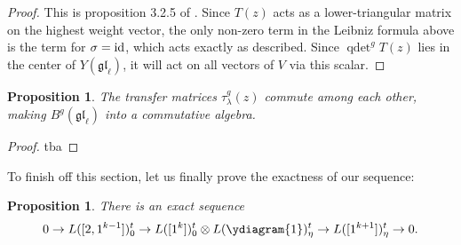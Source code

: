 \documentclass[11pt]{report}
\newtheorem{prop}[theorem]{Proposition}
\theoremstyle{definition}
\theoremstyle{remark}
\theoremstyle{remark}
\newcommand{\id}{\textnormal{id}}
\begin{document}
\begin{proof}
This is proposition 3.2.5 of \cite{book:molev}. Since $T(z)$ acts as a lower-triangular matrix on the highest weight vector, the only non-zero term in the Leibniz formula above is the term for $\sigma = \id$, which acts exactly as described. Since $\operatorname{qdet}^g T(z)$ lies in the center of $Y(\mathfrak{gl}_\ell)$, it will act on all vectors of $V$ via this scalar.
\end{proof}

\begin{prop}
The transfer matrices $\tau_\lambda^g(z)$ commute among each other, making $B^g(\mathfrak{gl}_\ell)$ into a commutative algebra.
\end{prop}

\begin{proof}
tba
\end{proof}

To finish off this section, let us finally prove the exactness of our sequence:

\begin{prop}
There is an exact sequence
\begin{equation*}
0 \to L([2,1^{k-1}])_0^t \to L([1^k])_0^t \otimes L(\ydiagram{1})_\eta^t \to L([1^{k+1}])_\eta^t \to 0.
\end{equation*}
\end{prop}
\end{document}
